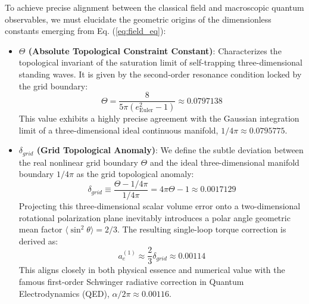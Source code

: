 \documentclass[12pt, a4paper]{article}
\begin{document}
To achieve precise alignment between the classical field and macroscopic quantum observables, we must elucidate the geometric origins of the dimensionless constants emerging from Eq. (\ref{eq:field_eq}):
\begin{itemize}
    \item \textbf{$\Theta$ (Absolute Topological Constraint Constant)}:  
    Characterizes the topological invariant of the saturation limit of self-trapping three-dimensional standing waves. It is given by the second-order resonance condition locked by the grid boundary:
    \begin{equation}
    \Theta = \frac{8}{5\pi (e_{\text{Euler}}^2 - 1)} \approx 0.0797138 \label{eq:theta}
    \end{equation}
    This value exhibits a highly precise agreement with the Gaussian integration limit of a three-dimensional ideal continuous manifold, $1/4\pi \approx 0.0795775$.
    
    \item \textbf{$\delta_{grid}$ (Grid Topological Anomaly)}:  
    We define the subtle deviation between the real nonlinear grid boundary $\Theta$ and the ideal three-dimensional manifold boundary $1/4\pi$ as the grid topological anomaly:
    \begin{equation}
    \delta_{grid} \equiv \frac{\Theta - 1/4\pi}{1/4\pi} = 4\pi\Theta - 1 \approx 0.0017129 \label{eq:delta_grid}
    \end{equation}
    Projecting this three-dimensional scalar volume error onto a two-dimensional rotational polarization plane inevitably introduces a polar angle geometric mean factor $\langle\sin^2\theta\rangle = 2/3$. The resulting single-loop torque correction is derived as:
    \begin{equation}
    a_e^{(1)} \approx \frac{2}{3} \delta_{grid} \approx 0.00114 \label{eq:schwinger}
    \end{equation}
    This aligns closely in both physical essence and numerical value with the famous first-order Schwinger radiative correction in Quantum Electrodynamics (QED), $\alpha/2\pi \approx 0.00116$.
    

\end{itemize}
\end{document}
